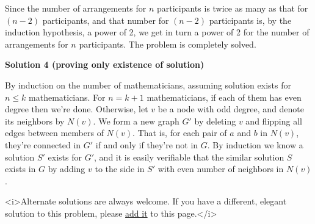 \begin{enumerate}
 Since the number of arrangements for $n$ participants is twice as many as that for $(n - 2)$ participants, and that number for $(n - 2)$ participants is, by the induction hypothesis, a power of 2, we get in turn a power of 2 for the number of arrangements for $n$ participants. The problem is completely solved.

 



\textbf{Solution 4 (proving only existence of solution)}

By induction on the number of mathematicians, assuming solution exists for $n\leq k$ mathematicians. For $n=k+1$  mathematicians, if each of them has even degree then we're done. Otherwise, let $v$ be a node with odd degree, and denote its neighbors by $N(v)$. We form a new graph $G'$ by deleting $v$ and flipping all edges between members of $N(v)$. That is, for each pair of $a$ and $b$ in $N(v)$, they're connected in $G'$ if and only if they're not in $G$. By induction we know a solution $S'$ exists for $G'$, and it is easily verifiable that the similar solution $S$ exists in $G$ by adding $v$ to the side in $S'$ with even number of neighbors in $N(v)$.

 <i>Alternate solutions are always welcome. If you have a different, elegant solution to this problem, please \href{https://artofproblemsolving.com/wiki/index.php?title=2008\_USAMO\_Problems/Problem\_6&action=edit}{add it} to this page.</i>



\end{enumerate}